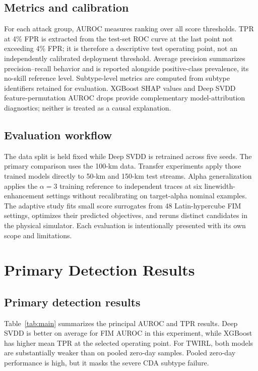\documentclass[12pt, a4paper]{report}
\begin{document}
\section{Metrics and calibration}
For each attack group, AUROC measures ranking over all score thresholds. TPR at 4\% FPR is extracted from the test-set ROC curve at the last point not exceeding 4\% FPR; it is therefore a descriptive test operating point, not an independently calibrated deployment threshold. Average precision summarizes precision--recall behavior and is reported alongside positive-class prevalence, its no-skill reference level. Subtype-level metrics are computed from subtype identifiers retained for evaluation. XGBoost SHAP values and Deep SVDD feature-permutation AUROC drops provide complementary model-attribution diagnostics; neither is treated as a causal explanation.

\section{Evaluation workflow}
The data split is held fixed while Deep SVDD is retrained across five seeds. The primary comparison uses the 100-km data. Transfer experiments apply those trained models directly to 50-km and 150-km test streams. Alpha generalization applies the $\alpha=3$ training reference to independent traces at six linewidth-enhancement settings without recalibrating on target-alpha nominal examples. The adaptive study fits small score surrogates from 48 Latin-hypercube FIM settings, optimizes their predicted objectives, and reruns distinct candidates in the physical simulator. Each evaluation is intentionally presented with its own scope and limitations.

\chapter{Primary Detection Results}
\section{Primary detection results}
Table~\ref{tab:main} summarizes the principal AUROC and TPR results. Deep SVDD is better on average for FIM AUROC in this experiment, while XGBoost has higher mean TPR at the selected operating point. For TWIRL, both models are substantially weaker than on pooled zero-day samples. Pooled zero-day performance is high, but it masks the severe CDA subtype failure.
\end{document}
